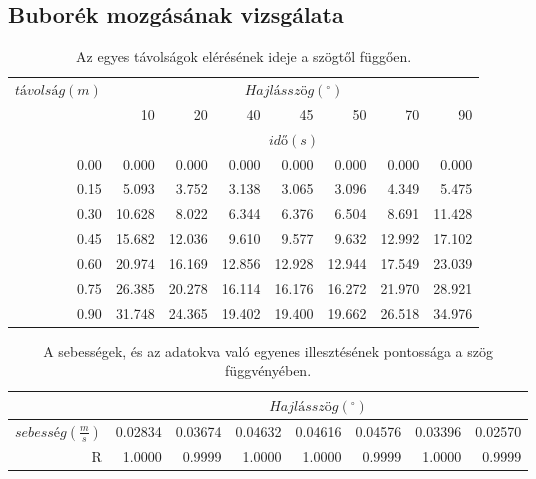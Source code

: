 \documentclass[10pt,pdftex]{report}
\begin{document}
\subsection*{Buborék mozgásának vizsgálata}
\begin{table}[H]
    \centering
    \begin{tabular}{|r|r|r|r|r|r|r|r|}
        \hline
        \multirow[c]{3}{*}{$távolság(m)$} & \multicolumn{7}{|c|}{$Hajlásszög(^{\circ})$} \\
        \cline{2-8}
        & 10 & 20 & 40 & 45 & 50 & 70 & 90 \\
        \cline{2-8}
        & \multicolumn{7}{|c|}{$idő(s)$} \\
        \hline
        0.00 & 0.000 & 0.000 & 0.000 & 0.000 & 0.000 & 0.000 & 0.000 \\
        \hline
        0.15 & 5.093 & 3.752 & 3.138 & 3.065 & 3.096 & 4.349 & 5.475 \\
        \hline
        0.30 & 10.628 & 8.022 & 6.344 & 6.376 & 6.504 & 8.691 & 11.428 \\
        \hline
        0.45 & 15.682 & 12.036 & 9.610 & 9.577 & 9.632 & 12.992 & 17.102 \\
        \hline
        0.60 & 20.974 & 16.169 & 12.856 & 12.928 & 12.944 & 17.549 & 23.039 \\
        \hline
        0.75 & 26.385 & 20.278 & 16.114 & 16.176 & 16.272 & 21.970 & 28.921 \\
        \hline
        0.90 & 31.748 & 24.365 & 19.402 & 19.400 & 19.662 & 26.518 & 34.976 \\
        \hline
    \end{tabular}
    \caption{Az egyes távolságok elérésének ideje a szögtől függően.}
\end{table}
\begin{table}[H]
    \centering
    \begin{tabular}{|r|r|r|r|r|r|r|r|}
        \hline
        & \multicolumn{7}{|c|}{$Hajlásszög(^{\circ})$} \\
        \hline
        $sebesség\left(\frac{m}{s}\right)$ & 0.02834 & 0.03674 & 0.04632 & 0.04616 & 0.04576 & 0.03396 & 0.02570 \\
        \hline
        R\footnotemark & 1.0000 & 0.9999 & 1.0000 & 1.0000 & 0.9999 & 1.0000 & 0.9999 \\
        \hline
    \end{tabular}
    \caption{A sebességek, és az adatokva való egyenes illesztésének pontossága a szög függvényében.}
\end{table}
\end{document}
